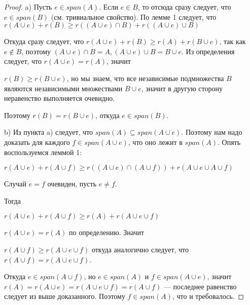 \documentclass[a4paper, 12pt]{article}
\begin{document}
\begin{proof}
  a) Пусть $e \in span(A)$. Если $e \in B$, то отсюда сразу следует, что $e \in
  span(B)$ (см. тривиальное свойство). По лемме 1 следует, что
  $r(A \cup e) + r(B) \geqslant r((A \cup e) \cap B) + r((A \cup e) \cup B)$

  Откуда сразу следует, что
  $r(A \cup e) + r(B) \geqslant r(A) + r(B \cup e)$, так как $e \not\in B$, поэтому
  $(A \cup e) \cap B = A, (A \cup e) \cup B = B \cup e$. Из определения следует,
  что $r(A \cup e) = r(A)$, значит

  $r(B) \geqslant r(B \cup e)$, но мы знаем, что все независимые подмножества $B$
  являются независимыми множествами $B \cup e$, значит в другую сторону
  неравенство выполняется очевидно.

  Поэтому $r(B) = r(B \cup e)$, откуда $e \in span(B)$.

  b) Из пункта a) следует, что $span(A) \subseteq span(A \cup e)$. Поэтому нам
  надо доказать для каждого $f \in span(A \cup e)$, что оно лежит в $span(A)$.
  Опять воспользуемся леммой 1:

  $r(A \cup e) + r(A \cup f) \geqslant r((A \cup e) \cap (A \cup f)) + r(A \cup e \cup A \cup f)$

  Случай $e = f$ очевиден, пусть $e \neq f$.

  Тогда

  $r(A \cup e) + r(A \cup f) \geqslant r(A) + r(A \cup e \cup f)$

  $r(A \cup e) = r(A)$ по определению. Значит

  $r(A \cup f) \geqslant r(A \cup e \cup f)$ откуда аналогично следует, что
  $r(A \cup f) = r(A \cup e \cup f)$.

  Откуда $e \in span(A \cup f)$, но $e \in span(A)$ и $f \in span(A \cup e)$, значит
  $r(A) = r(A \cup e) = r(A \cup e \cup f) = r(A \cup f)$ --- последнее
  равенство следует из выше доказанного. Поэтому $f \in span(A)$, что и требовалось.
\end{proof}
\end{document}
